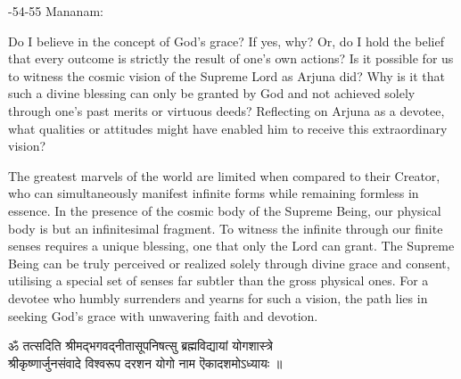 -54-55
Mananam:
\begin{mananam}{}
\normalfont\mananamtext Do I believe in the concept of God’s grace? If yes, why? Or, do I hold the belief that every outcome is strictly the result of one’s own actions?
Is it possible for us to witness the cosmic vision of the Supreme Lord as Arjuna did? Why is it that such a divine blessing can only be granted by God and not achieved solely through one’s past merits or virtuous deeds?
Reflecting on Arjuna as a devotee, what qualities or attitudes might have enabled him to receive this extraordinary vision? 
\end{mananam}
\sreflect
\begin{inspiration}{}
\normalfont\mananamtext The greatest marvels of the world are limited when compared to their Creator, who can simultaneously manifest infinite forms while remaining formless in essence. In the presence of the cosmic body of the Supreme Being, our physical body is but an infinitesimal fragment. To witness the infinite through our finite senses requires a unique blessing, one that only the Lord can grant.
The Supreme Being can be truly perceived or realized solely through divine grace and consent, utilising a special set of senses far subtler than the gross physical ones. For a devotee who humbly surrenders and yearns for such a vision, the path lies in seeking God’s grace with unwavering faith and devotion.
\end{inspiration}
\newpage

\begin{center}
\devfont ॐ तत्सदिति श्रीमद्भगवद्नीतासूपनिषत्सु  ब्रह्मविद्यायां  योगशास्त्रे\\
श्रीकृष्णार्जुनसंवादे  विश्वरूप दरशन योगो नाम ऎकादशमोऽध्यायः  ॥\\
\end{center}


